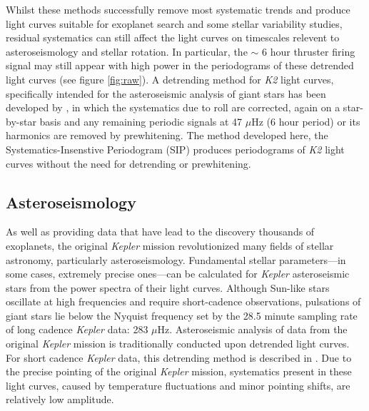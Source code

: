 Whilst these methods successfully remove most systematic trends and
produce light curves suitable for exoplanet search and some stellar
variability studies, residual systematics can still affect the light curves on
timescales relevent to asteroseismology and stellar rotation.
In particular, the $\sim$ 6 hour thruster firing signal may still appear
with high power in the periodograms of these detrended light curves
(see figure \ref{fig:raw}).
A detrending method for {\it K2} light curves, specifically intended for the
asteroseismic analysis of giant stars has been developed by \citet{Lund2015},
in which the systematics due to roll are corrected, again on
a star-by-star basis and any remaining periodic signals at 47 $\mu$Hz (6 hour
period) or its harmonics are removed by prewhitening.
The method developed here, the Systematics-Insenstive Periodogram (SIP)
produces periodograms of {\it K2} light curves without the need for detrending
or prewhitening.

\subsection{Asteroseismology}

As well as providing data that have lead to the discovery thousands of
exoplanets, the original {\it Kepler} mission revolutionized many fields of
stellar astronomy, particularly asteroseismology.
Fundamental stellar parameters---in some cases, extremely precise ones---can
be calculated for {\it Kepler} asteroseismic stars from the power spectra of
their light curves.
Although Sun-like stars oscillate at high frequencies and require
short-cadence observations, pulsations of giant stars lie below the Nyquist
frequency set by the 28.5 minute sampling rate of long cadence {\it Kepler}
data: 283 $\mu$Hz.
Asteroseismic analysis of data from the original {\it Kepler} mission is
traditionally conducted upon detrended light curves.
For short cadence {\it Kepler} data, this detrending method is described in
\citet{Garcia2011}.
Due to the precise pointing of the original {\it Kepler} mission, systematics
present in these light curves, caused by temperature fluctuations and minor
pointing shifts, are relatively low amplitude.


